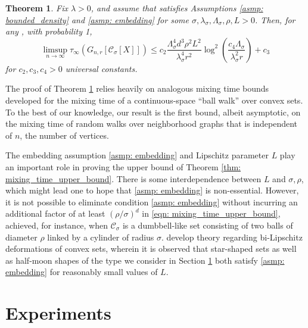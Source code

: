 \documentclass[11pt,twoside]{article}
\newtheorem{theorem}{Theorem}
\newcommand{\1}{\mathbf{1}}
\newcommand{\Xbf}{X}             %
\newcommand{\Cbb}{\mathbb{C}}
\newcommand{\Cset}{\mathcal{C}}
\newcommand{\Csig}{\Cset_{\sigma}}
\begin{document}
\begin{theorem}
  \label{thm: mixing_time_upper_bound}
  Fix $\lambda > 0$, and assume that \smash{$\Cset \in \Cbb_f(\lambda)$}
  satisfies Assumptions \ref{asmp: bounded_density} and \ref{asmp: embedding}
  for some $\sigma, \lambda_{\sigma}, \Lambda_{\sigma}, \rho, L > 0$. Then, for
  any , with probability 1,
  \begin{equation} 
    \label{eqn: mixing_time_upper_bound}
    \limsup_{n \to \infty}\tau_{\infty}(G_{n,r}[\Csig[\Xbf]]) \leq c_2 \frac{\Lambda_{\sigma}^4 d^3 \rho^2 L^2}{\lambda_{\sigma}^4 r^2} \log^2\left(\frac{c_4 \Lambda_{\sigma}}{\lambda_{\sigma}^2 r}\right) + c_3
  \end{equation}
  for $c_2,c_3,c_4 > 0$ universal constants. 
\end{theorem}

The proof of Theorem \ref{thm: mixing_time_upper_bound} relies heavily on
analogous mixing time bounds developed for the mixing time of a
continuous-space ``ball walk'' over convex sets. To the best of our knowledge, our
result is the first bound, albeit asymptotic, on the mixing time of random walks
over neighborhood graphs that is independent of $n$, the number of vertices.   

\vspace{0.2cm}

  The embedding assumption \ref{asmp: embedding} and Lipschitz parameter $L$
  play an important role in proving the upper bound of Theorem \ref{thm:
    mixing_time_upper_bound}. There is some interdependence between $L$ and
  $\sigma,\rho$, which might lead one to hope that \ref{asmp: embedding} is
  non-essential. However, it is not possible to eliminate condition \ref{asmp:
    embedding} without incurring an additional factor of at least
  $(\rho/\sigma)^d$ in \eqref{eqn: mixing_time_upper_bound}, achieved, for
  instance, when $\Csig$ is a dumbbell-like set consisting of two balls of
  diameter $\rho$ linked by a cylinder of radius
  $\sigma$. \citet{abbasi-yadkori2016, abbasi-yadkori2016a}  
  develop theory regarding bi-Lipschitz deformations of convex sets, wherein it
  is observed that star-shaped sets as well as half-moon shapes of the type we
  consider in Section \ref{sec: experiments} both satisfy \ref{asmp: embedding}
  for reasonably small values of $L$. 

\section{Experiments}
\label{sec: experiments}
\end{document}
